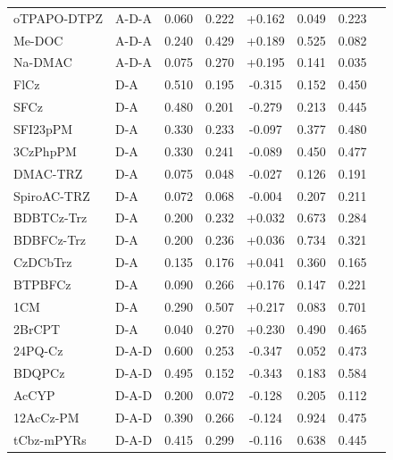 \begin{longtable}{llcccccc}
oTPAPO-DTPZ & A-D-A & 0.060 & 0.222 & +0.162 & 0.049 & 0.223 & \cite{doi101016jcej2022141061} \\
Me-DOC & A-D-A & 0.240 & 0.429 & +0.189 & 0.525 & 0.082 & \cite{doi101016jdyepig2020108521} \\
Na-DMAC & A-D-A & 0.075 & 0.270 & +0.195 & 0.141 & 0.035 & \cite{doi101016jcej2020126107} \\
FlCz & D-A & 0.510 & 0.195 & -0.315 & 0.152 & 0.450 & \cite{doi101039D2TC01766K} \\
SFCz & D-A & 0.480 & 0.201 & -0.279 & 0.213 & 0.445 & \cite{doi101039D2TC01766K} \\
SFI23pPM & D-A & 0.330 & 0.233 & -0.097 & 0.377 & 0.480 & \cite{doi101039D0TC00039F} \\
3CzPhpPM & D-A & 0.330 & 0.241 & -0.089 & 0.450 & 0.477 & \cite{doi101039D0TC00039F} \\
DMAC-TRZ & D-A & 0.075 & 0.048 & -0.027 & 0.126 & 0.191 & \cite{doi101016jorgel2019105610} \\
SpiroAC-TRZ & D-A & 0.072 & 0.068 & -0.004 & 0.207 & 0.211 & \cite{doi101039D1TC05906H} \\
BDBTCz-Trz & D-A & 0.200 & 0.232 & +0.032 & 0.673 & 0.284 & \cite{doi101039C9TC00419J} \\
BDBFCz-Trz & D-A & 0.200 & 0.236 & +0.036 & 0.734 & 0.321 & \cite{doi101039C9TC00419J} \\
CzDCbTrz & D-A & 0.135 & 0.176 & +0.041 & 0.360 & 0.165 & \cite{doi101039C6MH00579A} \\
BTPBFCz & D-A & 0.090 & 0.266 & +0.176 & 0.147 & 0.221 & \cite{doi101016jcej2020127293} \\
1CM & D-A & 0.290 & 0.507 & +0.217 & 0.083 & 0.701 & \cite{doi101016jsynthmet201611015} \\
2BrCPT & D-A & 0.040 & 0.270 & +0.230 & 0.490 & 0.465 & \cite{doi101016jmtener2021100705} \\
24PQ-Cz & D-A-D & 0.600 & 0.253 & -0.347 & 0.052 & 0.473 & \cite{doi101016jcclet201906033} \\
BDQPCz & D-A-D & 0.495 & 0.152 & -0.343 & 0.183 & 0.584 & \cite{doi101016jdyepig201702035} \\
AcCYP & D-A-D & 0.200 & 0.072 & -0.128 & 0.205 & 0.112 & \cite{doi101016jdyepig2019107849} \\
12AcCz-PM & D-A-D & 0.390 & 0.266 & -0.124 & 0.924 & 0.475 & \cite{doi101039C9TC04284A} \\
tCbz-mPYRs & D-A-D & 0.415 & 0.299 & -0.116 & 0.638 & 0.445 & \cite{doi101016jorgel2020105723} \\

\end{longtable}
